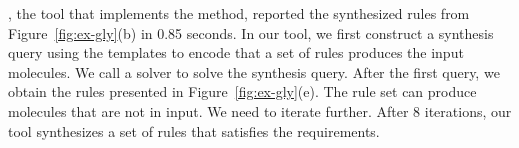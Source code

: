 \ourtool, the tool that implements the method, reported the synthesized rules from
Figure~\ref{fig:ex-gly}(b) in 0.85 seconds.
In our tool, we first construct a synthesis query using the templates to encode
that a set of rules produces the input molecules.
We call a solver to solve the synthesis query.
After the first query, we obtain the rules presented in Figure~\ref{fig:ex-gly}(e).
The rule set can produce molecules that are not in input.
We need to iterate further.
After 8 iterations, our tool synthesizes a set of rules that
satisfies the requirements.



